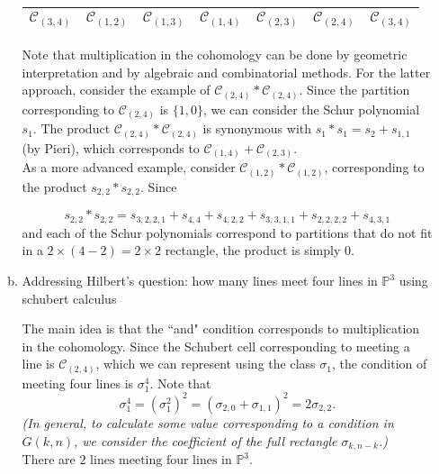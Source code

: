 \begin{itemize}
\begin{enumerate}[a)]
\begin{center}
\begin{tabular}{c | c | c | c | c | c | c}
            $\mathcal{C}_{(3, 4)}$ &$\mathcal{C}_{(1, 2)}$ & $\mathcal{C}_{(1, 3)}$ & $\mathcal{C}_{(1, 4)}$ & $\mathcal{C}_{(2, 3)}$ & $\mathcal{C}_{(2, 4)}$ & $\mathcal{C}_{(3, 4)}$ \\ \hline
        \end{tabular}
        \end{center}

        Note that multiplication in the cohomology can be done by geometric interpretation and by algebraic and combinatorial methods. For the latter approach, consider the example of $\mathcal{C}_{(2, 4)} \ast \mathcal{C}_{(2, 4)}$. Since the partition corresponding to $\mathcal{C}_{(2, 4)}$ is $\{1, 0\}$, we can consider the Schur polynomial $s_1$. The product $\mathcal{C}_{(2, 4)} \ast \mathcal{C}_{(2, 4)}$ is synonymous with $s_1 \ast s_1 = s_2 + s_{1, 1}$ (by Pieri), which corresponds to $\mathcal{C}_{(1, 4)} + \mathcal{C}_{(2, 3)}$. \\

        As a more advanced example, consider $\mathcal{C}_{(1, 2)} \ast \mathcal{C}_{(1, 2)}$, corresponding to the product $s_{2, 2} \ast s_{2, 2}$. Since

        \[
            s_{2, 2} \ast s_{2, 2} = s_{3, 2, 2, 1} + s_{4, 4} + s_{4, 2, 2} + s_{3, 3, 1, 1} + s_{2, 2, 2, 2} + s_{4, 3, 1}
        \]
        and each of the Schur polynomials correspond to partitions that do not fit in a $2 \times (4-2) = 2 \times 2$ rectangle, the product is simply $0$. \\

        \item Addressing Hilbert's question: how many lines meet four lines in $\mathbb{P}^3$ using schubert calculus
        
        The main idea is that the ``and" condition corresponds to multiplication in the cohomology. Since the Schubert cell corresponding to meeting a line is $\mathcal{C}_{(2, 4)}$, which we can represent using the class $\sigma_1$, the condition of meeting four lines is $\sigma_1^4$. Note that
        \[
            \sigma_1^4 = (\sigma_1^2)^2 = (\sigma_{2, 0} + \sigma_{1, 1})^2 = 2\sigma_{2, 2}.
        \]
        \textit{(In general, to calculate some value corresponding to a condition in $G(k, n)$, we consider the coefficient of the full rectangle $\sigma_{k, n-k}$.) } \\

        There are $\boxed{2 \text{ lines meeting four lines in }\mathbb{P}^3 }$.
        

\end{enumerate}
\end{itemize}
